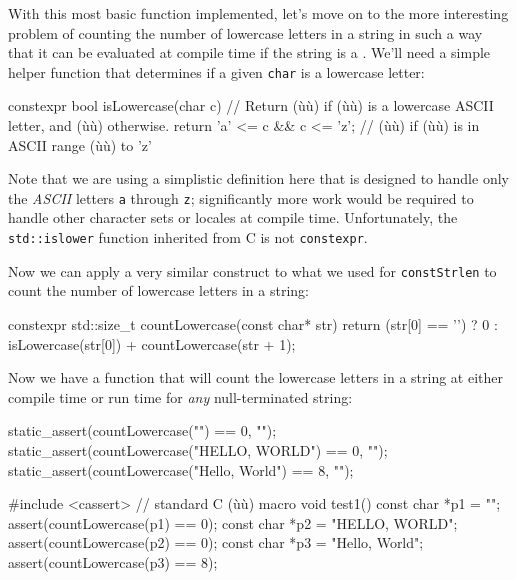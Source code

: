 \noindent With this most basic function implemented, let's move on to the more
interesting problem of counting the number of lowercase letters in a
string in such a way that it can be evaluated at compile time if the
string is a . We'll need a simple helper
function that determines if a given \lstinline!char! is a lowercase letter:

\begin{emcppslisting}[emcppsbatch={e12,e13}]
constexpr bool isLowercase(char c)
    // Return (ù{}ù) if (ù{}ù) is a lowercase ASCII letter, and (ù{}ù) otherwise.
{
    return 'a' <= c && c <= 'z';  // (ù{}ù) if (ù{}ù) is in ASCII range (ù{}ù) to 'z'
}
\end{emcppslisting}


\noindent Note that we are using a simplistic definition here that is designed to
handle only the \emph{ASCII} letters \lstinline!a! through \lstinline!z!;
significantly more work would be required to handle other character sets
or locales at compile time. Unfortunately, the \lstinline!std::islower!
function inherited from C is not \lstinline!constexpr!.

Now we can apply a very similar construct to what we used for
\lstinline!constStrlen! to count the number of lowercase letters in a
string:

\begin{emcppslisting}[emcppsbatch=e12]
constexpr std::size_t countLowercase(const char* str)
{
    return (str[0] == '\0') ? 0 : isLowercase(str[0]) + countLowercase(str + 1);
}
\end{emcppslisting}


\noindent Now we have a function that will count the lowercase letters in a string
at either compile time or run time for \emph{any} null-terminated
string:

\begin{emcppslisting}[emcppsbatch=e12]
static_assert(countLowercase("") == 0, "");
static_assert(countLowercase("HELLO, WORLD") == 0, "");
static_assert(countLowercase("Hello, World") == 8, "");

#include <cassert>  // standard C (ù{}ù) macro
void test1()
{
     const char *p1 = "";              assert(countLowercase(p1) == 0);
     const char *p2 = "HELLO, WORLD";  assert(countLowercase(p2) == 0);
     const char *p3 = "Hello, World";  assert(countLowercase(p3) == 8);
}
\end{emcppslisting}


